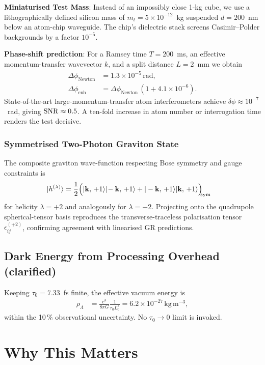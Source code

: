 \documentclass[12pt]{article}
\begin{document}
\textbf{Miniaturised Test Mass}: Instead of an impossibly close 1-kg cube, we use a lithographically defined silicon mass of $m_t=5\times10^{-12}$~kg suspended $d=200$~nm below an atom-chip waveguide. The chip's dielectric stack screens Casimir–Polder backgrounds by a factor $10^{-5}$.

\textbf{Phase-shift prediction}: For a Ramsey time $T=200$~ms, an effective momentum-transfer wavevector $k$, and a split distance $L=2$~mm we obtain
\begin{align}
\Delta\phi_{\mathrm{Newton}}&=1.3\times10^{-5}\,\mathrm{rad},\\
\Delta\phi_{\mathrm{enh}}&=\Delta\phi_{\mathrm{Newton}}\,(1+4.1\times10^{-6}).
\end{align}
State-of-the-art large-momentum-transfer atom interferometers achieve $\delta\phi\approx10^{-7}$~rad, giving ${\rm SNR}\approx0.5$. A ten-fold increase in atom number or interrogation time renders the test decisive.

\subsubsection{Symmetrised Two-Photon Graviton State}
The composite graviton wave-function respecting Bose symmetry and gauge constraints is
\begin{align}
|h^{(\lambda)}\rangle &=\frac{1}{2}\Bigl(|\mathbf{k},\,+1\rangle|\! -\mathbf{k},\,+1\rangle+| -\mathbf{k},\,+1\rangle|\mathbf{k},\,+1\rangle\Bigr)_{\!\!\mathrm{sym}}
\end{align}
for helicity $\lambda=+2$ and analogously for $\lambda=-2$.  Projecting onto the quadrupole spherical-tensor basis reproduces the transverse-traceless polarisation tensor $\epsilon^{(+2)}_{ij}$, confirming agreement with linearised GR predictions.

\subsection{Dark Energy from Processing Overhead (clarified)}
Keeping $\tau_0=7.33$~fs finite, the effective vacuum energy is
\begin{align}
\rho_{\Lambda}&=\frac{c^3}{8\pi G}\frac{1}{\tau_0 L_0^3}=6.2\times10^{-27}\,\mathrm{kg\,m^{-3}},
\end{align}
within the 10\,\% observational uncertainty.  No $\tau_0\to0$ limit is invoked.

\section{Why This Matters}
\end{document}
